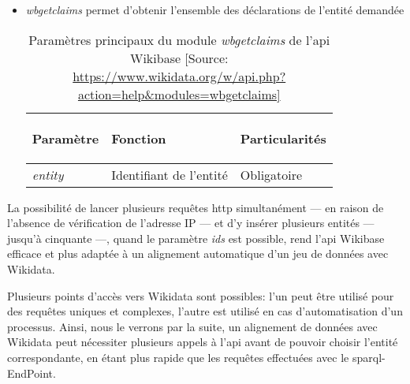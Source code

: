 \begin{itemize}
\begin{table}
		\label{wbgetentities}
	\end{table} 
	\item \textit{wbgetclaims} permet d'obtenir l'ensemble des déclarations de l'entité demandée
	\begin{table}
		\centering
		\begin{tabularx}{15cm}{|X|X|X|}
			\hline
			\begin{center}Paramètre\end{center}&\begin{center}Fonction\end{center}&\begin{center}Particularités\end{center}  \tabularnewline \hline
			\textit{entity}&Identifiant de l'entité&Obligatoire \tabularnewline \hline
		\end{tabularx}
		\caption[Paramètres principaux du module \textit{wbgetclaims} de l'\ac{api} Wikibase]{Paramètres principaux du module \textit{wbgetclaims} de l'\ac{api} Wikibase [Source: \url{https://www.wikidata.org/w/api.php?action=help\&modules=wbgetclaims]}}
		\label{wbgetclaims}
	\end{table} 
\end{itemize}
\medskip

La possibilité de lancer plusieurs requêtes \ac{http} simultanément --- en raison de l'absence de vérification de l'adresse IP --- et d'y insérer plusieurs entités --- jusqu'à cinquante ---, quand le paramètre \textit{ids} est possible, rend l'\ac{api} Wikibase efficace et plus adaptée à un alignement automatique d'un jeu de données avec Wikidata.

\bigskip
\bigskip
Plusieurs points d'accès vers Wikidata sont possibles: l'un peut être utilisé pour des requêtes uniques et complexes, l'autre est utilisé en cas d'automatisation d'un processus. Ainsi, nous le verrons par la suite, un alignement de données avec Wikidata peut nécessiter plusieurs appels à l'\ac{api} avant de pouvoir choisir l'entité correspondante, en étant plus rapide que les requêtes effectuées avec le \ac{sparql}-EndPoint. 